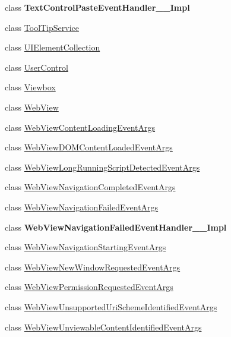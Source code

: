 \begin{DoxyCompactItemize}
\item 
class {\bfseries Text\+Control\+Paste\+Event\+Handler\+\_\+\+\_\+\+Impl}
\item 
class \hyperlink{class_windows_1_1_u_i_1_1_xaml_1_1_controls_1_1_tool_tip_service}{Tool\+Tip\+Service}
\item 
class \hyperlink{class_windows_1_1_u_i_1_1_xaml_1_1_controls_1_1_u_i_element_collection}{U\+I\+Element\+Collection}
\item 
class \hyperlink{class_windows_1_1_u_i_1_1_xaml_1_1_controls_1_1_user_control}{User\+Control}
\item 
class \hyperlink{class_windows_1_1_u_i_1_1_xaml_1_1_controls_1_1_viewbox}{Viewbox}
\item 
class \hyperlink{class_windows_1_1_u_i_1_1_xaml_1_1_controls_1_1_web_view}{Web\+View}
\item 
class \hyperlink{class_windows_1_1_u_i_1_1_xaml_1_1_controls_1_1_web_view_content_loading_event_args}{Web\+View\+Content\+Loading\+Event\+Args}
\item 
class \hyperlink{class_windows_1_1_u_i_1_1_xaml_1_1_controls_1_1_web_view_d_o_m_content_loaded_event_args}{Web\+View\+D\+O\+M\+Content\+Loaded\+Event\+Args}
\item 
class \hyperlink{class_windows_1_1_u_i_1_1_xaml_1_1_controls_1_1_web_view_long_running_script_detected_event_args}{Web\+View\+Long\+Running\+Script\+Detected\+Event\+Args}
\item 
class \hyperlink{class_windows_1_1_u_i_1_1_xaml_1_1_controls_1_1_web_view_navigation_completed_event_args}{Web\+View\+Navigation\+Completed\+Event\+Args}
\item 
class \hyperlink{class_windows_1_1_u_i_1_1_xaml_1_1_controls_1_1_web_view_navigation_failed_event_args}{Web\+View\+Navigation\+Failed\+Event\+Args}
\item 
class {\bfseries Web\+View\+Navigation\+Failed\+Event\+Handler\+\_\+\+\_\+\+Impl}
\item 
class \hyperlink{class_windows_1_1_u_i_1_1_xaml_1_1_controls_1_1_web_view_navigation_starting_event_args}{Web\+View\+Navigation\+Starting\+Event\+Args}
\item 
class \hyperlink{class_windows_1_1_u_i_1_1_xaml_1_1_controls_1_1_web_view_new_window_requested_event_args}{Web\+View\+New\+Window\+Requested\+Event\+Args}
\item 
class \hyperlink{class_windows_1_1_u_i_1_1_xaml_1_1_controls_1_1_web_view_permission_requested_event_args}{Web\+View\+Permission\+Requested\+Event\+Args}
\item 
class \hyperlink{class_windows_1_1_u_i_1_1_xaml_1_1_controls_1_1_web_view_unsupported_uri_scheme_identified_event_args}{Web\+View\+Unsupported\+Uri\+Scheme\+Identified\+Event\+Args}
\item 
class \hyperlink{class_windows_1_1_u_i_1_1_xaml_1_1_controls_1_1_web_view_unviewable_content_identified_event_args}{Web\+View\+Unviewable\+Content\+Identified\+Event\+Args}
\end{DoxyCompactItemize}
